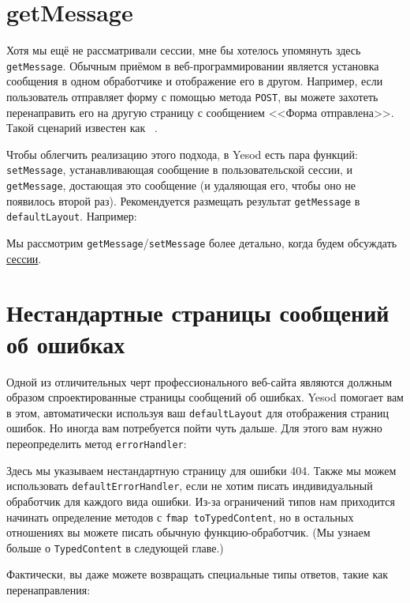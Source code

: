 \section {getMessage}

Хотя мы ещё не рассматривали сессии, мне бы хотелось упомянуть здесь
\lstinline!getMessage!. Обычным приёмом в веб-программировании является
установка сообщения в одном обработчике и отображение его в другом. Например,
если пользователь отправляет форму с помощью метода \lstinline!POST!, вы можете
захотеть перенаправить его на другую страницу с сообщением <<Форма
отправлена>>. Такой сценарий известен как~%
.

Чтобы облегчить реализацию этого подхода, в Yesod есть пара функций:
\lstinline!setMessage!, устанавливающая сообщение в пользовательской сессии, и
\lstinline!getMessage!, достающая это сообщение (и удаляющая его, чтобы оно не
появилось второй раз). Рекомендуется размещать результат \lstinline!getMessage!
в \lstinline!defaultLayout!. Например:


Мы рассмотрим \lstinline!getMessage!/\lstinline!setMessage! более детально,
когда будем обсуждать \hyperref[chap:sessions]{сессии}.

\section {Нестандартные страницы сообщений об ошибках}

Одной из отличительных черт профессионального веб-сайта являются должным
образом спроектированные страницы сообщений об ошибках. Yesod помогает вам в
этом, автоматически используя ваш \lstinline!defaultLayout! для отображения
страниц ошибок. Но иногда вам потребуется пойти чуть дальше. Для этого вам
нужно переопределить метод \lstinline!errorHandler!:


Здесь мы указываем нестандартную страницу для ошибки 404. Также мы можем
использовать \lstinline!defaultErrorHandler!, если не хотим писать
индивидуальный обработчик для каждого вида ошибки. Из-за ограничений типов нам
приходится начинать определение методов с \lstinline!fmap toTypedContent!, но в
остальных отношениях вы можете писать обычную функцию-обработчик. (Мы узнаем
больше о \lstinline!TypedContent! в следующей главе.)

Фактически, вы даже можете возвращать специальные типы ответов, такие как
перенаправления:

